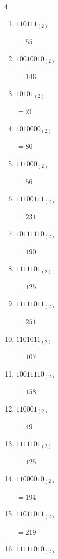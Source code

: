 \begin{multicols}{4}
\begin{enumerate}
        $=189$

  \item $110111_{(2)}$

        $=55$

  \item $10010010_{(2)}$

        $=146$

  \item $10101_{(2)}$

        $=21$

\columnbreak %

  \item $1010000_{(2)}$

        $=80$

  \item $111000_{(2)}$

        $=56$

  \item $11100111_{(2)}$

        $=231$

  \item $10111110_{(2)}$

        $=190$

  \item $1111101_{(2)}$

        $=125$

  \item $11111011_{(2)}$

        $=251$

  \item $1101011_{(2)}$

        $=107$

  \item $10011110_{(2)}$

        $=158$

  \item $110001_{(2)}$

        $=49$

  \item $1111101_{(2)}$

        $=125$

  \item $11000010_{(2)}$

        $=194$

  \item $11011011_{(2)}$

        $=219$

  \item $11111010_{(2)}$


\end{enumerate}
\end{multicols}
